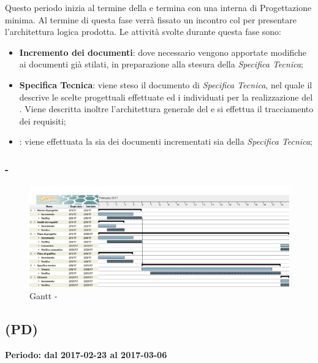 \documentclass[./PianoDiProgetto.tex]{subfiles}
\begin{document}
\begin{itemize}
  Questo periodo inizia al termine della \PerAD{} e termina con una  interna di \label{Revisione} Progettazione minima. Al termine di questa fase verrà fissato un incontro col  per presentare l'architettura logica prodotta. Le attività svolte durante questa fase sono:
  \begin{itemize}
    \item \textbf{Incremento dei documenti}: dove necessario vengono apportate modifiche ai documenti già stilati, in preparazione alla stesura della \textit{Specifica Tecnica};
    \item \textbf{Specifica Tecnica}: viene steso il documento di \textit{Specifica Tecnica}, nel quale il \PJ{} descrive le scelte progettuali effettuate ed i  individuati per la realizzazione del . Viene descritta inoltre l'architettura generale del  e si effettua il tracciamento dei requisiti;
    \item \textbf{}: viene effettuata la  sia dei documenti incrementati sia della \textit{Specifica Tecnica};
  \end{itemize}

  \end{itemize}
  \newpage
  \subsubsection{ - \PerPA}
    \begin{figure}[!h]
    \centering
    \includegraphics[width=\textwidth]{images/PA}
    \caption{Gantt - \PerPA}
    \end{figure}

  \subsection{\PerPD{} (PD)}
  \textbf{Periodo: dal 2017-02-23 al 2017-03-06}
\end{document}
